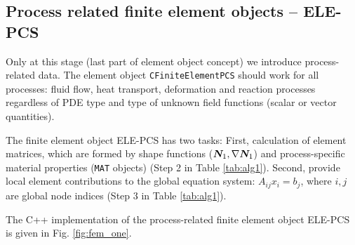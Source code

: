 \subsection{Process related finite element objects -- ELE-PCS}
\label{sec:ele_pcs}

Only at this stage (last part of element object concept) we
introduce process-related data. The element object
\texttt{CFiniteElementPCS} should work for all processes: fluid
flow, heat transport, deformation and reaction processes
regardless of PDE type and type of unknown field functions (scalar
or vector quantities).

The finite element object ELE-PCS has two tasks: First, calculation 
of element matrices, which are formed by shape functions 
($\bm N_1,\nabla\bm N_1$) and process-specific material properties 
(\texttt{MAT} objects) (Step 2 in Table \ref{tab:alg1}). Second, 
provide local element contributions to the global equation system: 
$A_{ij} x_i = b_j$, where $i,j$ are global node indices (Step 3 in 
Table \ref{tab:alg1}).

The C++ implementation of the process-related finite element
object ELE-PCS is given in Fig. \ref{fig:fem_one}.

